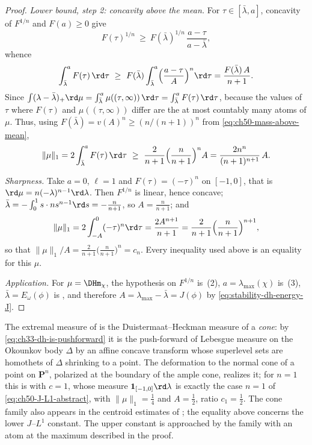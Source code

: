 \begin{proof}
\emph{Lower bound, step 2: concavity above the mean.}  For
$\tau\in[\bar\lambda,a]$, concavity of $F^{1/n}$ and
$F(a)\ge0$ give
\[
 F(\tau)^{1/n}\ \ge\ F(\bar\lambda)^{1/n}\,\frac{a-\tau}{a-\bar\lambda},
\]
whence
\[
 \int_{\bar\lambda}^{a}F(\tau)\,\rd\tau
 \ \ge\ F(\bar\lambda)\int_{\bar\lambda}^{a}
      \Bigl(\frac{a-\tau}{A}\Bigr)^{n}\rd\tau
 =\frac{F(\bar\lambda)\,A}{n+1}.
\]
Since $\int(\lambda-\bar\lambda)_+\rd\mu
=\int_{\bar\lambda}^{a}\mu((\tau,\infty))\,\rd\tau
=\int_{\bar\lambda}^{a}F(\tau)\,\rd\tau$, because the values of $\tau$
where $F(\tau)$ and $\mu((\tau,\infty))$ differ are the at most countably
many atoms of $\mu$.  Thus, using
$F(\bar\lambda)=v(A)^n\ge(n/(n+1))^n$ from
\eqref{eq:ch50-mass-above-mean},
\[
 \|\mu\|_1=2\int_{\bar\lambda}^{a}F(\tau)\,\rd\tau
 \ \ge\ \frac{2}{n+1}\Bigl(\frac{n}{n+1}\Bigr)^{n}A
 =\frac{2n^n}{(n+1)^{n+1}}\,A .
\]

\emph{Sharpness.}  Take $a=0$, $\ell=1$ and
$F(\tau)=(-\tau)^n$ on $[-1,0]$, that is
$\rd\mu=n(-\lambda)^{n-1}\rd\lambda$.  Then
$F^{1/n}$ is linear, hence concave; $\bar\lambda=-\int_0^1s\cdot
ns^{n-1}\rd s=-\frac n{n+1}$, so $A=\frac n{n+1}$; and
\[
 \|\mu\|_1=2\int_{-A}^0(-\tau)^n\rd\tau=\frac{2A^{n+1}}{n+1}
 =\frac{2}{n+1}\Bigl(\frac n{n+1}\Bigr)^{n+1},
\]
so that $\|\mu\|_1/A=\frac2{n+1}\bigl(\frac n{n+1}\bigr)^n=c_n$.  Every
inequality used above is an equality for this $\mu$.

\emph{Application.}  For $\mu=\DHm_\chi$, the hypothesis on $F^{1/n}$
is \,(2), $a=\lambda_{\max}(\chi)$ is
\,(3), $\bar\lambda=E_\omega(\phi)$ is
, and therefore $A=\lambda_{\max}-\bar\lambda
=J(\phi)$ by \eqref{eq:stability-dh-energy-J}.
\end{proof}

\begin{remark}
\label{rem:ch50-extremal-cone}
The extremal measure of  is the Duistermaat--Heckman
measure of a \emph{cone}: by \eqref{eq:ch33-dh-is-pushforward} it is the
push-forward of Lebesgue measure on the Okounkov body $\Delta$ by an
affine concave transform whose superlevel sets are homothets of $\Delta$
shrinking to a point.  The deformation to the normal cone of a point on
$\mathbf P^n$, polarized at the boundary of the ample cone, realizes it;
for $n=1$ this is  with $c=1$, whose measure
$\mathbf 1_{[-1,0]}\rd\lambda$ is exactly the case $n=1$ of
\eqref{eq:ch50-J-L1-abstract}, with
$\|\mu\|_1=\tfrac14$ and $A=\tfrac12$, ratio $c_1=\tfrac12$.  The cone family also appears in the centroid estimates of
; the equality above concerns the lower
$J$--$L^1$ constant.  The upper constant is approached by the
family with an atom at the maximum described in the proof.
\end{remark}

